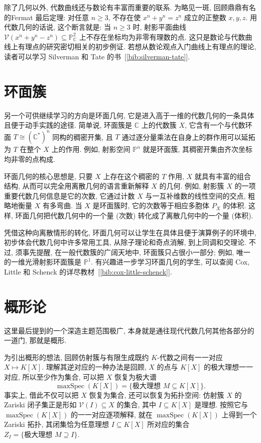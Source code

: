 除了几何以外, 代数曲线还与数论有丰富而重要的联系. 为略见一斑, 回顾鼎鼎有名的\textquotedbl{}Fermat 最后定理\textquotedbl{}: 对任意 $n\ge3$, 不存在使 $x^{n}+y^{n}=z^{n}$ 成立的正整数 $x,y,z$. 用代数几何的话说, 这个断言就是: 当 $n\ge3$ 时, 射影平面曲线 $\mathcal{V}(x^{n}+y^{n}-z^{n})\subseteq\mathbb{P}_{\mathbb{C}}^{2}$ 上不存在坐标均为非零有理数的点. 这只是数论与代数曲线上有理点的研究密切相关的初步例证. 若想从数论观点入门曲线上有理点的理论, 读者可以学习 Silverman 和 Tate 的书~[\ref{bib:silverman-tate}].

\section*{环面簇}

另一个可供继续学习的方向是环面几何, 它是进入高于一维的代数几何的一条具体且便于动手实践的途径. 简单说, 环面簇是 $\mathbb{C}$ 上的代数簇 $X$, 它含有一个与\textquotedbl{}代数环面\textquotedbl{} $T\cong(\mathbb{C}^{*})^{n}$ 同构的稠密开集, 且 $T$ 通过逐分量乘法在自身上的群作用可以延拓为 $T$ 在整个 $X$ 上的作用. 例如, 射影空间 $\mathbb{P}^{n}$ 就是环面簇, 其稠密开集由齐次坐标均非零的点构成.

环面几何的核心思想是, 只要 $X$ 上存在这个稠密的 $T$ 作用, $X$ 就具有丰富的组合结构, 从而可以完全用离散几何的语言重新解释 $X$ 的几何. 例如, 射影簇 $X$ 的一项重要代数几何信息是它的次数, 它通过计数 $X$ 与一互补维数的线性空间的交点, 粗略地衡量 $X$ 有多\textquotedbl{}弯曲\textquotedbl{}. 当 $X$ 是环面簇时, 它的次数等于相应多胞体 $P_{X}$ 的体积. 这样, 环面几何把代数几何中的一个量 (次数) 转化成了离散几何中的一个量 (体积).

凭借这种向离散情形的转化, 环面几何可以让学生在具体且便于演算例子的环境中, 初步体会代数几何中许多常用工具, 从除子理论和奇点消解, 到上同调和交理论. 不过, 须事先提醒, 在一般代数簇的广阔天地中, 环面簇只占很小一部分; 例如, 唯一的一维光滑射影环面簇是 $\mathbb{P}^{1}$. 有兴趣进一步学习环面几何的学生, 可以查阅 Cox, Little 和 Schenck 的详尽教材~[\ref{bib:cox-little-schenck}].

\section*{概形论}

这里最后提到的一个深造主题范围极广, 本身就是通往现代代数几何其他各部分的一道门, 那就是概形.

为引出概形的想法, 回顾仿射簇与有限生成既约 $K$-代数之间有一一对应 $X\mapsto K[X]$. 理解其逆对应的一种办法是回顾, $X$ 的点与 $K[X]$ 的极大理想一一对应, 所以至少作为集合, 可以把 $X$ 恢复为极大谱
\[
  \operatorname{maxSpec}(K[X])=\{\text{极大理想 }M\subseteq K[X]\}.
\]
事实上, 借此不仅可以把 $X$ 恢复为集合, 还可以恢复为拓扑空间: 仿射簇 $X$ 的 Zariski 闭子集正是形如 $\mathcal{V}(I)\subseteq X$ 的集合, 其中 $I\subseteq K[X]$ 是理想. 按照它与 $\operatorname{maxSpec}(K[X])$ 的一一对应逐项解释, 就在 $\operatorname{maxSpec}(K[X])$ 上得到一个 Zariski 拓扑, 其闭集恰为任意理想 $I\subseteq K[X]$ 所对应的集合 $Z_{I}=\{\text{极大理想 }M\supseteq I\}$.

